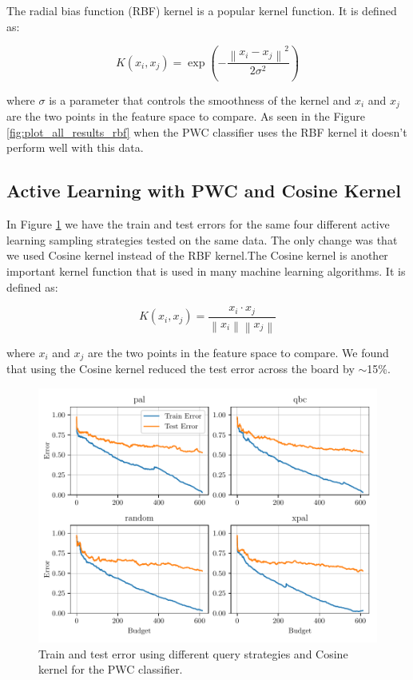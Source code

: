 The radial bias function (RBF) kernel is a popular kernel function. It is defined as:

\begin{equation}
    K(x_i, x_j) = \exp\left(- \frac{\left\| x_i - x_j \right\|^2}{2 \sigma^2}\right)
\label{eq:rbf_kernel}
\end{equation}

where $\sigma$ is a parameter that controls the smoothness of the kernel and $x_i$ and $x_j$ are the two points in the feature space to compare. As seen in the Figure \ref{fig:plot_all_results_rbf} when the PWC classifier uses the RBF kernel it doesn't perform well with this data.

\subsection{Active Learning with PWC and Cosine Kernel}

In Figure \ref{fig:plot_all_results_cosine} we have the train and test errors for the same four different active learning sampling strategies tested on the same data. The only change was that we used Cosine kernel instead of the RBF kernel.The Cosine kernel is another important kernel function that is used in many machine learning algorithms. It is defined as:

\begin{equation}
    K(x_i, x_j) = \frac{x_i \cdot x_j}{\left\| x_i \right\| \left\| x_j \right\|}
\label{eq:cosine_kernel}
\end{equation}

where $x_i$ and $x_j$ are the two points in the feature space to compare. We found that using the Cosine kernel reduced the test error across the board by $\sim$15\%.  

\begin{figure}[ht]
  \centering
  \includegraphics[width=\scale\textwidth]{../img/plot_all_results_cosine.pdf}
  \caption{Train and test error using different query strategies and Cosine kernel for the PWC classifier.}
  \label{fig:plot_all_results_cosine}
\end{figure}


